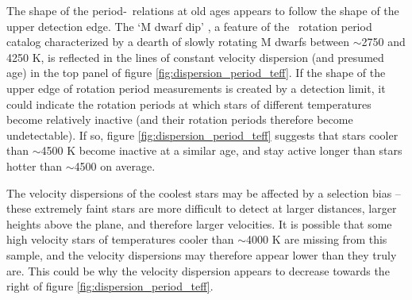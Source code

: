 The shape of the period-\teff\ relations at old ages appears to follow the
shape of the upper detection edge.
The `M dwarf dip' \citep{vansaders2018}, a feature of the \mct\ rotation
period catalog characterized by a dearth of slowly rotating M dwarfs between
$\sim$2750 and 4250 K, is reflected in the lines of constant velocity
dispersion (and presumed age) in the top panel of figure
\ref{fig:dispersion_period_teff}.
If the shape of the upper edge of rotation period measurements is created by a
detection limit, it could indicate the rotation periods at which stars of
different temperatures become relatively inactive (and their rotation periods
therefore become undetectable).
If so, figure \ref{fig:dispersion_period_teff} suggests that stars cooler than
$\sim$4500 K become inactive at a similar age, and stay active longer than
stars hotter than $\sim$4500 on average.


The velocity dispersions of the coolest stars may be affected by a selection
bias -- these extremely faint stars are more difficult to detect at larger
distances, larger heights above the plane, and therefore larger velocities.
It is possible that some high velocity stars of temperatures cooler than
$\sim$4000 K are missing from this sample, and the velocity dispersions may
therefore appear lower than they truly are.
This could be why the velocity dispersion appears to decrease towards the
right of figure \ref{fig:dispersion_period_teff}.


